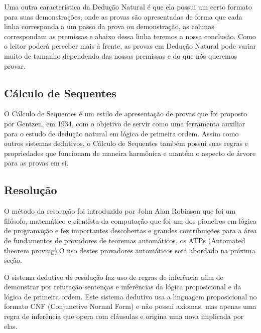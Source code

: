 Uma outra característica da Dedução Natural é que ela possui um certo formato para suas demonstrações, onde as provas são apresentadas de forma que cada linha corresponda a um passo da prova ou demonstração, as colunas correspondam as premissas e abaixo dessa linha teremos a nossa conclusão. Como o leitor poderá perceber mais à frente, as provas em Dedução Natural pode variar muito de tamanho dependendo das nossas premissas e do que nós queremos provar.

\subsection{Cálculo de Sequentes}

O Cálculo de Sequentes é um estilo de apresentação de provas que foi proposto por Gentzen, em 1934, com o objetivo de servir como uma ferramenta auxiliar para o estudo de dedução natural em lógica de primeira ordem. Assim como outros sistemas dedutivos, o Cálculo de Sequentes também possui suas regras e propriedades que funcionam de maneira harmônica e mantém o aspecto de árvore para as provas em si.




\subsection{Resolução}

 O método da resolução foi introduzido por John Alan Robinson que foi um filósofo, matemático e cientista da computação que foi um dos pioneiros em lógica de programação e fez importantes descobertas e grandes contribuições para a área de fundamentos
de provadores de teoremas automáticos, os ATPs (Automated theorem proving).O uso destes provadores automáticos será abordado na próxima seção.

 O sistema dedutivo de resolução faz uso de regras de inferência afim de demonstrar por refutação sentenças e inferências da lógica proposicional e da lógica de primeira ordem. Este sistema dedutivo usa a linguagem proposicional no formato CNF (Conjunctive Normal Form) e nâo possui axiomas, mas apenas uma regra de inferência que opera com cláusulas e origina uma nova implicada por elas.


